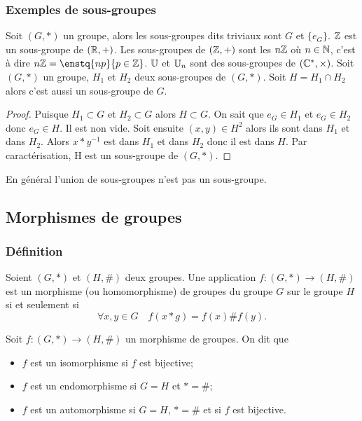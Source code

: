 \subsubsection{Exemples de sous-groupes}

Soit $(G,*)$ un groupe, alors les sous-groupes dits triviaux sont $G$ et $\{e_G\}$. $\mathbb{Z}$ est un sous-groupe de $(\mathbb{R},+)$. Les sous-groupes de $(\mathbb{Z},+)$ sont les $n\mathbb{Z}$ où $n \in \mathbb{N}$, c'est à dire $n\Z=\enstq{np}{p \in \Z}$. $\mathbb{U}$ et $\mathbb{U}_n$ sont des sous-groupes de $(\mathbb{C}^{*},\times)$. Soit $(G,*)$ un groupe, $H_1$ et $H_2$ deux sous-groupes de $(G,*)$. Soit $H = H_1 \cap H_2$ alors c'est aussi un sous-groupe de $G$.
\begin{proof}
  Puisque $H_1 \subset G$ et $H_2 \subset G$ alors $H \subset G$. On sait que $e_G \in H_1$ et $e_G \in H_2$ donc $e_G \in H$. Il est non vide. Soit ensuite $(x,y) \in H^2$ alors ils sont dans $H_1$ et dans $H_2$. Alors $x*y^{-1}$ est dans $H_1$ et dans $H_2$ donc il est dans $H$. Par caractérisation, H est un sous-groupe de $(G,*)$.
\end{proof}

En général l'union de sous-groupes n'est pas un sous-groupe.

\subsection{Morphismes de groupes}

\subsubsection{Définition}

\begin{defdef}
  Soient $(G,*)$ et $(H,\#)$ deux groupes. Une application $f:(G,*) \longrightarrow (H,\#)$ est un morphisme (ou homomorphisme) de groupes du groupe $G$ sur le groupe $H$ si et seulement si
  \begin{equation}
    \forall x,y \in G \quad f(x*g) = f(x)\#f(y).
  \end{equation}
\end{defdef}
Soit $f:(G,*) \longrightarrow (H,\#)$ un morphisme de groupes. On dit que
\begin{itemize}
\item $f$ est un isomorphisme si $f$ est bijective;
\item $f$ est un endomorphisme si $G=H$ et $*=\#$;
\item $f$ est un automorphisme si $G=H$, $*=\#$ et si $f$ est bijective.
\end{itemize}

